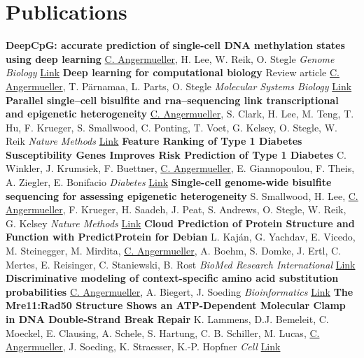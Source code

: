 \documentclass[11pt,a4paper]{moderncv}
\newcommand\chref[3][magenta]{\href{#2}{\small\color{#1}#3}}
\begin{document}
\section{Publications}
         {\textbf{DeepCpG: accurate prediction of single-cell DNA methylation states using deep learning}}
         {}
         {\hfill\break \underline{C. Angermueller}, H. Lee, W. Reik, O. Stegle}
         {\hfill\break \textit{Genome Biology}}
         {\chref{2017-04-11}{Link}}
         {\textbf{Deep learning for computational biology}}
         {Review article}
         {\hfill\break \underline{C. Angermueller}, T. P\"arnamaa, L. Parts, O. Stegle}
         {\hfill\break \textit{Molecular Systems Biology}}
         {\chref{http://msb.embopress.org/content/12/7/878}{Link}}
         {\textbf{Parallel single–cell bisulfite and rna–sequencing link transcriptional and epigenetic heterogeneity}}
         {}
         {\hfill\break \underline{C. Angermueller}, S.  Clark, H.  Lee, M. Teng, T. Hu, F. Krueger, S. Smallwood, C. Ponting, T. Voet, G. Kelsey, O.  Stegle, W. Reik}
         {\hfill\break \textit{Nature Methods}}
         {\chref{http://www.nature.com/nmeth/journal/v13/n3/full/nmeth.3728.html}{Link}}
         {\textbf{Feature Ranking of Type 1 Diabetes Susceptibility Genes Improves Risk Prediction of Type 1 Diabetes}}
         {}
         {\hfill\break C. Winkler, J. Krumsiek, F. Buettner, \underline{C. Angermueller}, E. Giannopoulou, F. Theis, A. Ziegler, E. Bonifacio}
         {\hfill\break \textit{Diabetes}}
         {\chref{http://www.ncbi.nlm.nih.gov/pubmed/25186292}{Link}}
         {\textbf{Single-cell genome-wide bisulfite sequencing for assessing epigenetic heterogeneity}}
         {}
         {\hfill\break S. Smallwood, H. Lee, \underline{C. Angermueller}, F. Krueger, H. Saadeh, J. Peat, S. Andrews, O. Stegle, W. Reik, G. Kelsey}
         {\hfill\break \textit{Nature Methods}}
         {\chref{http://www.nature.com/nmeth/journal/v11/n8/full/nmeth.3035.html}{Link}}
         {\textbf{Cloud Prediction of Protein Structure and Function with PredictProtein for Debian}}
         {}
         {\hfill\break L. Kaján, G. Yachdav, E. Vicedo, M. Steinegger, M. Mirdita, \underline{C. Angermueller}, A. Boehm, S. Domke, J. Ertl, C. Mertes, E. Reisinger, C. Staniewski, B. Rost}
         {\hfill\break \textit{BioMed Research International}}
         {\chref{http://www.hindawi.com/journals/bmri/2013/398968/}{Link}}
         {\textbf{Discriminative modeling of context-specific amino acid substitution probabilities}}
         {}
         {\hfill\break \underline{C. Angermueller}, A. Biegert, J. Soeding}
         {\hfill\break \textit{Bioinformatics}}
         {\chref{http://www.ncbi.nlm.nih.gov/pubmed/23080114}{Link}}
         {\textbf{The Mre11:Rad50 Structure Shows an ATP-Dependent Molecular Clamp in DNA Double-Strand Break Repair}}
         {}
         {\hfill\break K. Lammens, D.J. Bemeleit, C. Moeckel, E. Clausing, A. Schele, S. Hartung, C. B. Schiller, M. Lucas, \underline{C. Angermueller}, J. Soeding, K. Straesser, K.-P. Hopfner}
         {\hfill\break\textit{Cell}}
         {\chref{http://dx.doi.org/10.1016/j.cell.2011.02.038}{Link}}
\end{document}
